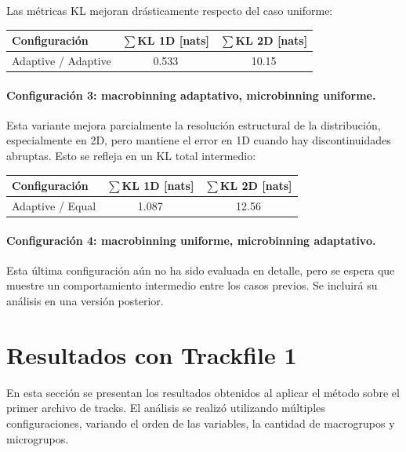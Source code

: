 Las métricas KL mejoran drásticamente respecto del caso uniforme:

\begin{center}
\begin{tabular}{lcc}
\toprule
\textbf{Configuración} & $\sum$KL 1D [nats] & $\sum$KL 2D [nats] \\
\midrule
Adaptive / Adaptive & 0.533 & 10.15 \\
\bottomrule
\end{tabular}
\end{center}

\paragraph{Configuración 3: macrobinning adaptativo, microbinning uniforme.}  
Esta variante mejora parcialmente la resolución estructural de la distribución, especialmente en 2D, pero mantiene el error en 1D cuando hay discontinuidades abruptas. Esto se refleja en un KL total intermedio:

\begin{center}
\begin{tabular}{lcc}
\toprule
\textbf{Configuración} & $\sum$KL 1D [nats] & $\sum$KL 2D [nats] \\
\midrule
Adaptive / Equal & 1.087 & 12.56 \\
\bottomrule
\end{tabular}
\end{center}

\paragraph{Configuración 4: macrobinning uniforme, microbinning adaptativo.}  
Esta última configuración aún no ha sido evaluada en detalle, pero se espera que muestre un comportamiento intermedio entre los casos previos. Se incluirá su análisis en una versión posterior.



\section{Resultados con Trackfile 1}
\label{sec:resultados-track1}

En esta sección se presentan los resultados obtenidos al aplicar el método sobre el primer archivo de tracks. El análisis se realizó utilizando múltiples configuraciones, variando el orden de las variables, la cantidad de macrogrupos y microgrupos.

